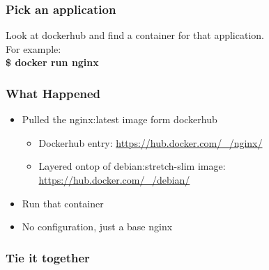 \documentclass[aspectratio=169,11pt,hyperref={colorlinks=true}]{beamer}
\begin{document}
\begin{frame}
    \frametitle{Pick an application}
    Look at dockerhub and find a container for that application. \\
    For example:\\
    \textbf{\$ docker run nginx}
\end{frame}

\begin{frame}
    \frametitle{What Happened}
    \begin{itemize}
        \item Pulled the nginx:latest image form dockerhub
            \begin{itemize}
                \item Dockerhub entry: \href{https://hub.docker.com/\_/nginx/}{https://hub.docker.com/\_/nginx/}
                \item Layered ontop of debian:stretch-slim image: \href{https://hub.docker.com/\_/debian/}{https://hub.docker.com/\_/debian/}
            \end{itemize}
        \item Run that container
        \item No configuration, just a base nginx
    \end{itemize}
\end{frame}

\begin{frame}
    \frametitle{Tie it together}
    
\end{frame}
\end{document}
